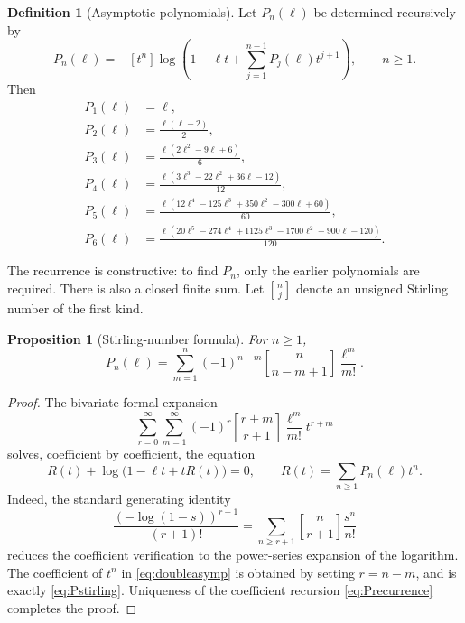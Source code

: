 \documentclass[11pt,openany]{book}
\theoremstyle{plain}
\newtheorem{proposition}[theorem]{Proposition}
\theoremstyle{definition}
\newtheorem{definition}[theorem]{Definition}
\theoremstyle{remark}
\begin{document}
\begin{definition}[Asymptotic polynomials]\label{def:Pn}
Let \(P_n(\ell)\) be determined recursively by
\begin{equation}\label{eq:Precurrence}
 P_n(\ell)=-[t^n]\log\left(
  1-\ell t+\sum_{j=1}^{n-1}P_j(\ell)t^{j+1}
 \right),\qquad n\ge1.
\end{equation}
Then
\begin{align*}
P_1(\ell)&=\ell,\\
P_2(\ell)&=\frac{\ell(\ell-2)}2,\\
P_3(\ell)&=\frac{\ell(2\ell^2-9\ell+6)}6,\\
P_4(\ell)&=\frac{\ell(3\ell^3-22\ell^2+36\ell-12)}{12},\\
P_5(\ell)&=\frac{\ell(12\ell^4-125\ell^3+350\ell^2-300\ell+60)}{60},\\
P_6(\ell)&=\frac{\ell(20\ell^5-274\ell^4+1125\ell^3-1700\ell^2
          +900\ell-120)}{120}.
\end{align*}
\end{definition}

The recurrence is constructive: to find \(P_n\), only the earlier polynomials
are required.  There is also a closed finite sum.  Let
\(\genfrac{[}{]}{0pt}{}{n}{j}\) denote an unsigned Stirling number of the first
kind.

\begin{proposition}[Stirling-number formula]\label{prop:Pstirling}
For \(n\ge1\),
\begin{equation}\label{eq:Pstirling}
 P_n(\ell)=\sum_{m=1}^{n}
   (-1)^{n-m}\genfrac{[}{]}{0pt}{}{n}{n-m+1}\frac{\ell^m}{m!}.
\end{equation}
\end{proposition}

\begin{proof}
The bivariate formal expansion
\begin{equation}\label{eq:doubleasymp}
 \sum_{r=0}^{\infty}\sum_{m=1}^{\infty}
   (-1)^r\genfrac{[}{]}{0pt}{}{r+m}{r+1}
   \frac{\ell^m}{m!}t^{r+m}
\end{equation}
solves, coefficient by coefficient, the equation
\[
 R(t)+\log\bigl(1-\ell t+tR(t)\bigr)=0,
 \qquad R(t)=\sum_{n\ge1}P_n(\ell)t^n.
\]
Indeed, the standard generating identity
\[
 \frac{(-\log(1-s))^{r+1}}{(r+1)!}
 =\sum_{n\ge r+1}\genfrac{[}{]}{0pt}{}{n}{r+1}\frac{s^n}{n!}
\]
reduces the coefficient verification to the power-series expansion of the
logarithm.  The coefficient of \(t^n\) in \eqref{eq:doubleasymp} is obtained
by setting \(r=n-m\), and is exactly \eqref{eq:Pstirling}.  Uniqueness of the
coefficient recursion \eqref{eq:Precurrence} completes the proof.
\end{proof}
\end{document}
